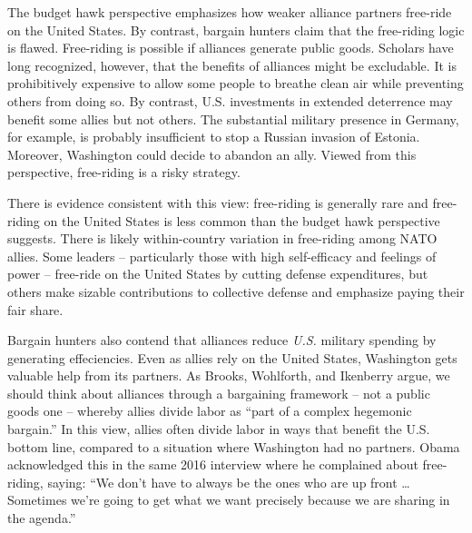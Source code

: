 The budget hawk perspective emphasizes how weaker alliance partners free-ride on the United States. By contrast, bargain hunters claim that the free-riding logic is flawed. Free-riding is possible if alliances generate public goods. Scholars have long recognized, however, that the benefits of alliances might be excludable.\autocite[See, for example,][]{Sandler1993} It is prohibitively expensive to allow some people to breathe clean air while preventing others from doing so. By contrast, U.S. investments in extended deterrence may benefit some allies but not others. The substantial military presence in Germany, for example, is probably insufficient to stop a Russian invasion of Estonia. Moreover, Washington could decide to abandon an ally. Viewed from this perspective, free-riding is a risky strategy.\autocite{Fuhrmann2020} 

There is evidence consistent with this view: free-riding is generally rare\autocite{Alley2021} and free-riding on the United States is less common than the budget hawk perspective suggests.  There is likely within-country variation in free-riding among NATO allies. Some leaders -- particularly those with high self-efficacy and feelings of power -- free-ride on the United States by cutting defense expenditures, but others make sizable contributions to collective defense and emphasize paying their fair share.\autocite{Fuhrmann2020}

Bargain hunters also contend that alliances reduce \textit{U.S.} military spending by generating effeciencies. Even as allies rely on the United States, Washington gets valuable help from its partners. As Brooks, Wohlforth, and Ikenberry argue, we should think about alliances through a bargaining framework -- not a public goods one -- whereby allies divide labor as ``part of a complex hegemonic bargain.''\autocite[28]{Brooksetal2013} In this view, allies often divide labor in ways that benefit the U.S. bottom line, compared to a situation where Washington had no partners. Obama acknowledged this in the same 2016 interview where he complained about free-riding, saying: ``We don't have to always be the ones who are up front \ldots Sometimes we're going to get what we want precisely because we are sharing in the agenda.''\autocite{goldbergA16}

